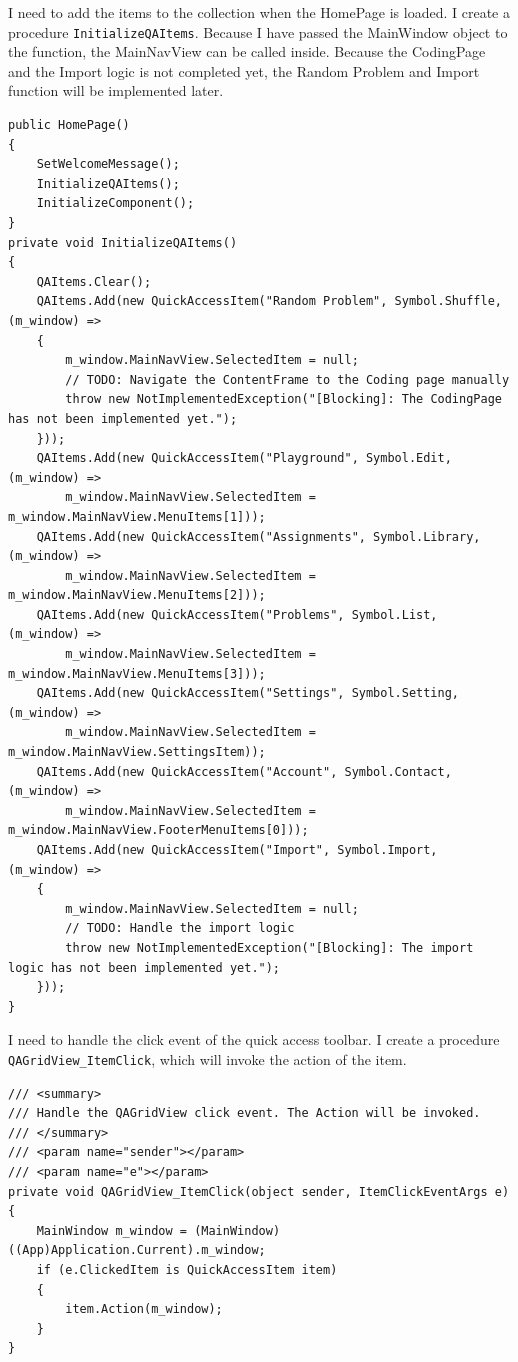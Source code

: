 \documentclass[a4paper]{report}
\begin{document}
I need to add the items to the collection when the HomePage is loaded. I create a procedure \texttt{InitializeQAItems}. Because I have passed the MainWindow object to the function, the MainNavView can be called inside. Because the CodingPage and the Import logic is not completed yet, the Random Problem and Import function will be implemented later.

\begin{verbatim}
public HomePage()
{
    SetWelcomeMessage();
    InitializeQAItems();
    InitializeComponent();
}
private void InitializeQAItems()
{
    QAItems.Clear();
    QAItems.Add(new QuickAccessItem("Random Problem", Symbol.Shuffle, (m_window) =>
    {
        m_window.MainNavView.SelectedItem = null;
        // TODO: Navigate the ContentFrame to the Coding page manually
        throw new NotImplementedException("[Blocking]: The CodingPage has not been implemented yet.");
    }));
    QAItems.Add(new QuickAccessItem("Playground", Symbol.Edit, (m_window) =>
        m_window.MainNavView.SelectedItem = m_window.MainNavView.MenuItems[1]));
    QAItems.Add(new QuickAccessItem("Assignments", Symbol.Library, (m_window) =>
        m_window.MainNavView.SelectedItem = m_window.MainNavView.MenuItems[2]));
    QAItems.Add(new QuickAccessItem("Problems", Symbol.List, (m_window) =>
        m_window.MainNavView.SelectedItem = m_window.MainNavView.MenuItems[3]));
    QAItems.Add(new QuickAccessItem("Settings", Symbol.Setting, (m_window) =>
        m_window.MainNavView.SelectedItem = m_window.MainNavView.SettingsItem));
    QAItems.Add(new QuickAccessItem("Account", Symbol.Contact, (m_window) =>
        m_window.MainNavView.SelectedItem = m_window.MainNavView.FooterMenuItems[0]));
    QAItems.Add(new QuickAccessItem("Import", Symbol.Import, (m_window) =>
    {
        m_window.MainNavView.SelectedItem = null;
        // TODO: Handle the import logic
        throw new NotImplementedException("[Blocking]: The import logic has not been implemented yet.");
    }));
}
\end{verbatim}

I need to handle the click event of the quick access toolbar. I create a procedure \texttt{QAGridView_ItemClick}, which will invoke the action of the item.

\begin{verbatim}
/// <summary>
/// Handle the QAGridView click event. The Action will be invoked.
/// </summary>
/// <param name="sender"></param>
/// <param name="e"></param>
private void QAGridView_ItemClick(object sender, ItemClickEventArgs e)
{
    MainWindow m_window = (MainWindow)((App)Application.Current).m_window;
    if (e.ClickedItem is QuickAccessItem item)
    {
        item.Action(m_window);
    }
}
\end{verbatim}
\end{document}
